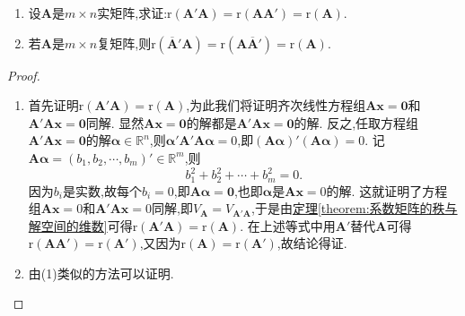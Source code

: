 \documentclass[../../main.tex]{subfiles}
\begin{document}
\begin{proposition}\label{proposition:r(AA')=r(A)}
\begin{enumerate}[(1)]
\item 设\(\boldsymbol{A}\)是\(m\times n\)实矩阵,求证:\(\mathrm{r}(\boldsymbol{A}'\boldsymbol{A})=\mathrm{r}(\boldsymbol{A}\boldsymbol{A}')=\mathrm{r}(\boldsymbol{A})\).

\item 若\(\boldsymbol{A}\)是\(m\times n\)复矩阵,则\(\mathrm{r}\left(\overline{\boldsymbol{A}}'\boldsymbol{A}\right)=\mathrm{r}\left(\boldsymbol{A}\overline{\boldsymbol{A}}'\right)=\mathrm{r}(\boldsymbol{A})\).
\end{enumerate}
\end{proposition}
\begin{proof}
\begin{enumerate}[(1)]
\item 首先证明\(\mathrm{r}(\boldsymbol{A}'\boldsymbol{A})=\mathrm{r}(\boldsymbol{A})\),为此我们将证明齐次线性方程组\(\boldsymbol{A}\boldsymbol{x}=\boldsymbol{0}\)和\(\boldsymbol{A}'\boldsymbol{A}\boldsymbol{x}=\boldsymbol{0}\)同解. 显然\(\boldsymbol{A}\boldsymbol{x}=\boldsymbol{0}\)的解都是\(\boldsymbol{A}'\boldsymbol{A}\boldsymbol{x}=\boldsymbol{0}\)的解. 反之,任取方程组\(\boldsymbol{A}'\boldsymbol{A}\boldsymbol{x}=\boldsymbol{0}\)的解\(\boldsymbol{\alpha}\in\mathbb{R}^n\),则\(\boldsymbol{\alpha}'\boldsymbol{A}'\boldsymbol{A}\boldsymbol{\alpha}=0\),即\((\boldsymbol{A}\boldsymbol{\alpha})'(\boldsymbol{A}\boldsymbol{\alpha}) = 0\). 记\(\boldsymbol{A}\boldsymbol{\alpha}=(b_1,b_2,\cdots,b_m)'\in\mathbb{R}^m\),则
\[
b_1^2 + b_2^2+\cdots + b_m^2 = 0.
\]
因为\(b_i\)是实数,故每个\(b_i = 0\),即\(\boldsymbol{A}\boldsymbol{\alpha}=\boldsymbol{0}\),也即\(\boldsymbol{\alpha}\)是\(\boldsymbol{A}\boldsymbol{x}=0\)的解. 这就证明了方程组\(\boldsymbol{A}\boldsymbol{x}=0\)和\(\boldsymbol{A}'\boldsymbol{A}\boldsymbol{x}=0\)同解,即\(V_{\boldsymbol{A}}=V_{\boldsymbol{A}'\boldsymbol{A}}\),于是由\hyperref[theorem:系数矩阵的秩与解空间的维数]{定理\ref{theorem:系数矩阵的秩与解空间的维数}}可得\(\mathrm{r}(\boldsymbol{A}'\boldsymbol{A})=\mathrm{r}(\boldsymbol{A})\). 在上述等式中用\(\boldsymbol{A}'\)替代\(\boldsymbol{A}\)可得\(\mathrm{r}(\boldsymbol{A}\boldsymbol{A}')=\mathrm{r}(\boldsymbol{A}')\),又因为\(\mathrm{r}(\boldsymbol{A})=\mathrm{r}(\boldsymbol{A}')\),故结论得证.

\item 由(1)类似的方法可以证明.
\end{enumerate}
\end{proof}
\end{document}
